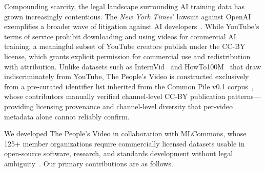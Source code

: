 \documentclass{article}
\begin{document}
Compounding scarcity, the legal landscape surrounding AI training data has grown increasingly contentious. The \textit{New York Times}' lawsuit against OpenAI exemplifies a broader wave of litigation against AI developers~\cite{nyt_lawsuit}. While YouTube's terms of service prohibit downloading and using videos for commercial AI training, a meaningful subset of YouTube creators publish under the CC-BY license, which grants explicit permission for commercial use and redistribution with attribution. Unlike datasets such as InternVid~\cite{wang2024internvid} and HowTo100M~\cite{miech2019howto100m} that draw indiscriminately from YouTube, The People's Video is constructed exclusively from a pre-curated identifier list inherited from the Common Pile v0.1 corpus~\cite{kandpal2025commonpile}, whose contributors manually verified channel-level CC-BY publication patterns---providing licensing provenance and channel-level diversity that per-video metadata alone cannot reliably confirm.

We developed The People's Video in collaboration with MLCommons, whose 125+ member organizations require commercially licensed datasets usable in open-source software, research, and standards development without legal ambiguity~\cite{mlcommons2024}. Our primary contributions are as follows.
\end{document}

